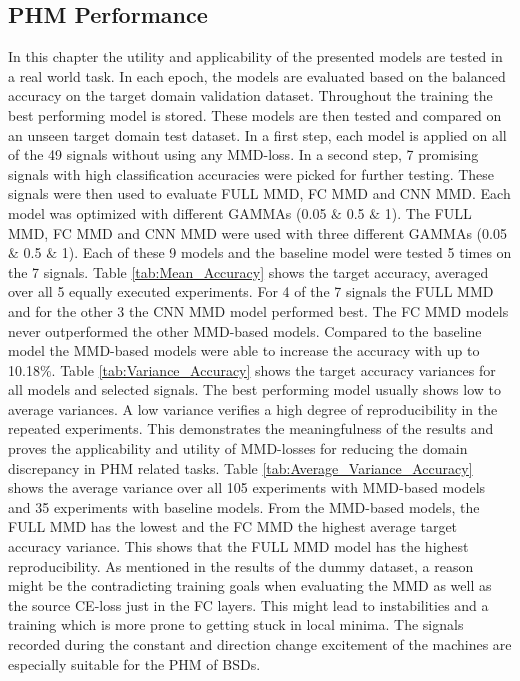 \subsection{PHM Performance}\label{ch:PHM_performance}
In this chapter the utility and applicability of the presented models are tested in a real world task. In each epoch, the models are evaluated based on the balanced accuracy on the target domain validation dataset. Throughout the training the best performing model is stored. These models are then tested and compared on an unseen target domain test dataset. In a first step, each model is applied on all of the 49 signals without using any MMD-loss. In a second step, 7 promising signals with high classification accuracies were picked for further testing. These signals were then used to evaluate FULL MMD, FC MMD and CNN MMD. Each model was optimized with different GAMMAs (0.05 $\&$ 0.5 $\&$ 1). The FULL MMD, FC MMD and CNN MMD were used with three different GAMMAs (0.05 $\&$ 0.5 $\&$ 1). Each of these 9 models and the baseline model were tested 5 times on the 7 signals. Table \ref{tab:Mean_Accuracy} shows the target accuracy, averaged over all 5 equally executed experiments. For 4 of the 7 signals the FULL MMD and for the other 3 the CNN MMD model performed best. The FC MMD models never outperformed the other MMD-based models. Compared to the baseline model the MMD-based models were able to increase the accuracy with up to 10.18$\%$. Table \ref{tab:Variance_Accuracy} shows the target accuracy variances for all models and selected signals. The best performing model usually shows low to average variances. A low variance verifies a high degree of reproducibility in the repeated experiments. This demonstrates the meaningfulness of the results and proves the applicability and utility of MMD-losses for reducing the domain discrepancy in PHM related tasks. Table \ref{tab:Average_Variance_Accuracy} shows the average variance over all 105 experiments with MMD-based models and 35 experiments with baseline models. From the MMD-based models, the FULL MMD has the lowest and the FC MMD the highest average target accuracy variance. This shows that the FULL MMD model has the highest reproducibility. As mentioned in the results of the dummy dataset, a reason might be the contradicting training goals when evaluating the MMD as well as the source CE-loss just in the FC layers. This might lead to instabilities and a training which is more prone to getting stuck in local minima. The signals recorded during the constant and direction change excitement of the machines are especially suitable for the PHM of BSDs. 

